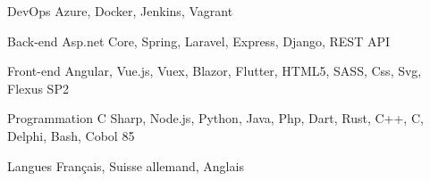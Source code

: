 

\begin{cvskills}

  \cvskill
    {DevOps} %
    {Azure, Docker, Jenkins, Vagrant} %

  \cvskill
    {Back-end} %
    {Asp.net Core, Spring, Laravel, Express, Django, REST API} %

  \cvskill
    {Front-end} %
    {Angular, Vue.js, Vuex, Blazor, Flutter, HTML5, SASS, Css, Svg, Flexus SP2} %

  \cvskill
    {Programmation} %
    {C Sharp, Node.js, Python, Java, Php, Dart, Rust, C++, C, Delphi, Bash, Cobol 85} %

  \cvskill
    {Langues} %
    {Français, Suisse allemand, Anglais} %

\end{cvskills}
